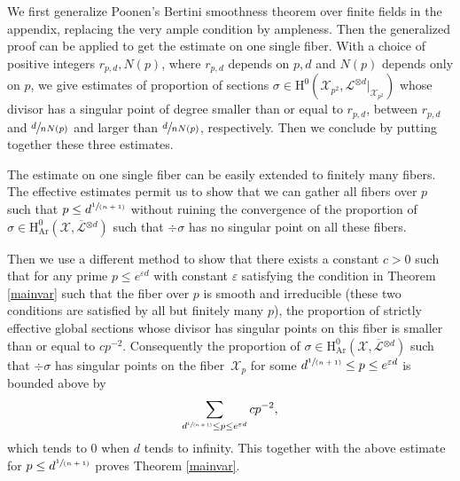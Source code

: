 \documentclass[JEP,XML,SOM,Unicode,published]{cedram}
\newcommand{\spfrac}[2]{\sfrac{#1}{(#2)}}
\theoremstyle{plain}
\theoremstyle{definition}
\newcommand{\ho}{\mathrm{H}}
\newcommand{\X}{\mathcal{X}}
\newcommand{\Li}{\overline{\mathcal{L}}{}}
\newcommand{\li}{\mathcal{L}}
\begin{document}
We first generalize Poonen's Bertini smoothness theorem over finite fields in the appendix, replacing the very ample condition by ampleness. Then the generalized proof can be applied to get the estimate on one single fiber. With a choice of positive integers $r_{p,d},N(p)$, where $r_{p,d}$ depends on $p,d$ and $N(p)$ depends only on $p$, we give estimates of proportion of sections $\sigma\in \ho^0(\X_{p^2}, \li^{\otimes d}|_{\X_{p^2}})$ whose divisor has a singular point of degree smaller than or equal to $r_{p,d}$, between $r_{p,d}$ and $\sfrac{d}{nN(p)}$ and larger than $\sfrac{d}{nN(p)}$, respectively. Then we conclude by putting together these three estimates.

The estimate on one single fiber can be easily extended to finitely many fibers. The effective estimates permit us to show that we can gather all fibers over $p$ such that $p\leq d^{\spfrac{1}{n+1}}$ without ruining the convergence of the proportion of $\sigma \in \ho^0_{\mathrm{Ar}}(\X, \Li^{\otimes d})$ such that $\div \sigma$ has no singular point on all these fibers.

Then we use a different method to show that there exists a constant $c>0$ such that for any prime $ p \leq e^{\varepsilon d}$ with constant $\varepsilon$ satisfying the condition in Theorem \ref{mainvar} such that the fiber over $p$ is smooth and irreducible (these two conditions are satisfied by all but finitely many $p$), the proportion of strictly effective global sections whose divisor has singular points on this fiber is smaller than or equal to $cp^{-2}$. Consequently the proportion of $\sigma \in \ho^0_{\mathrm{Ar}}(\X, \Li^{\otimes d})$ such that $\div \sigma$ has singular points on the fiber~$\X_p$ for some $d^{\spfrac{1}{n+1}}\leq p \leq e^{\varepsilon d}$ is bounded above by
\[
\sum_{d^{\spfrac{1}{n+1}}\leq p \leq e^{\varepsilon d}}cp^{-2},
\]
which tends to $0$ when $d$ tends to infinity. This together with the above estimate for $p\leq d^{\spfrac{1}{n+1}}$ proves Theorem \ref{mainvar}.
\end{document}
